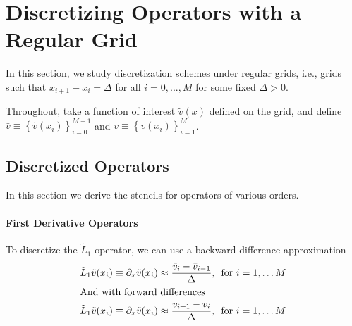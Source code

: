 \documentclass[11pt]{article}
\newcommand{\set}[1]{\ensuremath{\left\{{#1}\right\}}}
\newcommand{\D}[1][]{\ensuremath{\partial_{#1}}}
\theoremstyle{definition}
\begin{document}
\section{Discretizing Operators with a Regular Grid}
In this section, we study discretization schemes under regular grids, i.e., grids such that $x_{i+1} - x_i = \Delta$ for all $i = 0,...,M$ for some fixed $\Delta > 0$.

Throughout, take a function of interest $\tilde{v}(x)$ defined on the grid, and define $\bar{v} \equiv \set{\tilde{v}(x_i)}_{i=0}^{M+1}$ and $v \equiv \set{\tilde{v}(x_i)}_{i=1}^{M}$.

\subsection{Discretized Operators}
In this section we derive the stencils for operators of various orders.

\paragraph{First Derivative Operators}
To discretize the $\tilde{L}_1$ operator, we can use a backward difference approximation
 \begin{align}
\tilde{L}_1 \tilde{v}(x_i) &\equiv \D[x] \tilde{v}(x_i) \approx \frac{\bar{v}_i - \bar{v}_{i-1}}{\Delta},\, \text{ for } i = 1,\ldots M\label{eq:first-order-bd}\\
\intertext{And with forward differences}
\tilde{L}_1 \tilde{v}(x_i) &\equiv \D[x] \tilde{v}(x_i) \approx \frac{\bar{v}_{i+1} - \bar{v}_i}{\Delta},\, \text{ for } i = 1,\ldots M\label{eq:first-order-fd}
\end{align}
\end{document}
